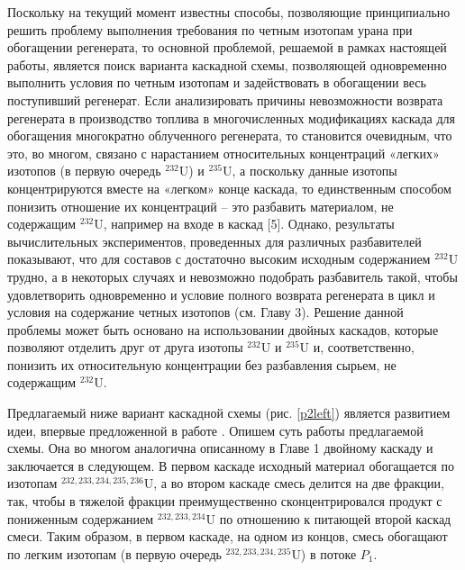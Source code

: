 Поскольку на текущий момент известны способы, позволяющие принципиально решить проблему выполнения требования по четным изотопам урана при обогащении регенерата, то основной проблемой, решаемой в рамках настоящей работы, является поиск варианта каскадной схемы, позволяющей одновременно выполнить условия по четным изотопам и задействовать в обогащении весь поступивший регенерат. 
Если анализировать причины невозможности возврата регенерата в производство топлива в многочисленных модификациях каскада для обогащения многократно облученного регенерата, то становится очевидным, что это, во многом, связано с нарастанием относительных концентраций «легких» изотопов (в первую очередь $^{232}$U) и $^{235}$U, а поскольку данные изотопы концентрируются вместе на «легком» конце каскада, то единственным способом понизить отношение их концентраций – это разбавить материалом, не содержащим $^{232}$U, например на входе в каскад [5]. Однако, результаты вычислительных экспериментов, проведенных для различных разбавителей показывают, что для составов с достаточно высоким исходным содержанием $^{232}$U трудно, а в некоторых случаях и невозможно подобрать разбавитель такой, чтобы удовлетворить одновременно и условие полного возврата регенерата в цикл и условия на содержание четных изотопов (см. Главу 3). 
Решение данной проблемы может быть основано на использовании двойных каскадов, которые позволяют отделить друг от друга изотопы $^{232}$U и $^{235}$U и, соответственно, понизить их относительную концентрации без разбавления сырьем, не содержащим $^{232}$U. 

Предлагаемый ниже вариант каскадной схемы (рис. \ref{p2left}) является развитием идеи, впервые предложенной в работе \cite{vodolazskihSposobIzotopnogoVosstanovleniya2006}. Опишем суть работы предлагаемой схемы. Она во многом аналогична описанному в Главе 1 двойному каскаду и заключается в следующем. В первом каскаде исходный материал обогащается по изотопам $^{232,233,234,235,236}$U, а во втором каскаде смесь делится на две фракции, так, чтобы в тяжелой фракции преимущественно сконцентрировался продукт с пониженным содержанием $^{232,233,234}$U по отношению к питающей второй каскад смеси. Таким образом, в первом каскаде, на одном из концов, смесь обогащают по легким изотопам (в первую очередь $^{232,233,234,235}$U) в потоке $P_1$.

